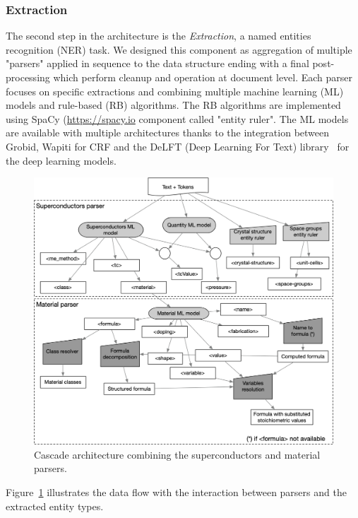 \documentclass{article}
\begin{document}
\subsubsection{Extraction}
\label{subsubsec:extraction}

The second step in the architecture is the \textit{Extraction}, a named entities recognition (NER) task.
We designed this component as aggregation of multiple "parsers" applied in sequence to the data structure ending with a final post-processing which perform cleanup and operation at document level. 
Each parser focuses on specific extractions and combining multiple machine learning (ML) models and rule-based (RB) algorithms.
The RB algorithms are implemented using SpaCy (\url{https://spacy.io} component called "entity ruler".
The ML models are available with multiple architectures thanks to the integration between Grobid, Wapiti for CRF and the DeLFT (Deep Learning For Text) library~\cite{DeLFT} for the deep learning models. 


\begin{figure}[ht]
\includegraphics[width=\textwidth]{extraction-schema-2}
\caption{\label{fig:extraction-ml-models-cascade-architecture} Cascade architecture combining the superconductors and material parsers.}
\end{figure}

Figure~\ref{fig:extraction-ml-models-cascade-architecture} illustrates the data flow with the interaction between parsers and the extracted entity types. 
\end{document}

